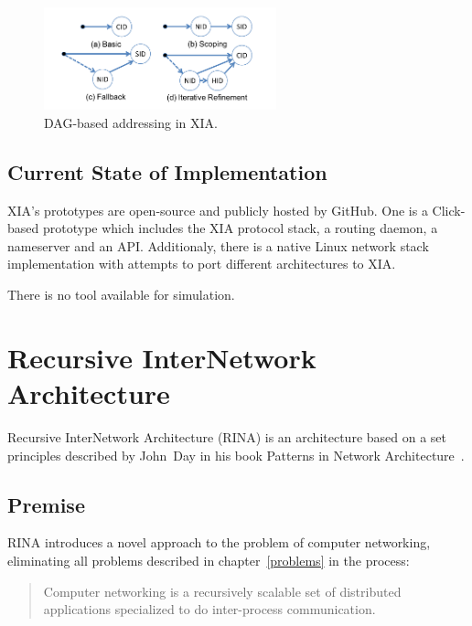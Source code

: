                 \begin{figure}[H]
                    \begin{center}
                        \includegraphics[width=0.6\textwidth]{fig/archs_xia-dag.png}
                        \caption{DAG-based addressing in XIA.}
                        \label{fig:xia_dag}
                    \end{center}
                \end{figure}

        \subsection{Current State of Implementation}

            XIA's prototypes are open-source and publicly hosted by GitHub. One is a Click-based prototype which includes the XIA protocol stack, a routing daemon, a nameserver and an API. Additionaly, there is a native Linux network stack implementation with attempts to port different architectures to XIA.

            There is no tool available for simulation.

    \section{Recursive InterNetwork Architecture}\label{archs:rina}

        Recursive InterNetwork Architecture (RINA) is an architecture based on a set principles described by John~Day in his book Patterns in Network Architecture~\cite{Patterns}.

        \subsection{Premise}

            RINA introduces a novel approach to the problem of computer networking, eliminating all problems described in chapter~\ref{problems} in the process:

            \begin{quotation}
                \centering
                Computer networking is a recursively scalable set of distributed applications specialized to do inter-process communication.
            \end{quotation}

